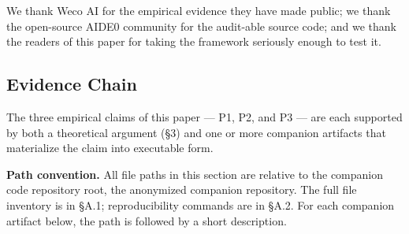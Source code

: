 \documentclass{article}
\theoremstyle{definition}
\begin{document}
We thank Weco AI for the empirical evidence they have made public; we thank the open-source AIDE0 community for the audit-able source code; and we thank the readers of this paper for taking the framework seriously enough to test it.

\subsection{Evidence Chain}

The three empirical claims of this paper --- P1, P2, and P3 --- are each supported by both a theoretical argument (\S3) and one or more companion artifacts that materialize the claim into executable form.

\textbf{Path convention.} All file paths in this section are relative to the companion code repository root, the anonymized companion repository. The full file inventory is in \S A.1; reproducibility commands are in \S A.2. For each companion artifact below, the path is followed by a short description.
\end{document}
